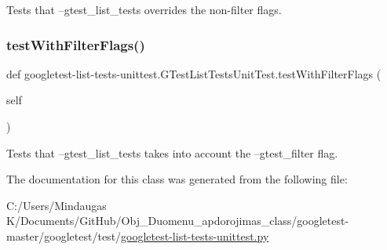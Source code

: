 \begin{DoxyVerb}Tests that --gtest_list_tests overrides the non-filter flags.\end{DoxyVerb}
 \mbox{\label{classgoogletest-list-tests-unittest_1_1_g_test_list_tests_unit_test_adb60d2295fee8ed4af2a5ee1a32e5778}} 
\subsubsection{\texorpdfstring{testWithFilterFlags()}{testWithFilterFlags()}}
{\footnotesize\ttfamily def googletest-\/list-\/tests-\/unittest.\+G\+Test\+List\+Tests\+Unit\+Test.\+test\+With\+Filter\+Flags (\begin{DoxyParamCaption}\item[{}]{self }\end{DoxyParamCaption})}

\begin{DoxyVerb}Tests that --gtest_list_tests takes into account the
--gtest_filter flag.\end{DoxyVerb}
 

The documentation for this class was generated from the following file\+:\begin{DoxyCompactItemize}
\item 
C\+:/\+Users/\+Mindaugas K/\+Documents/\+Git\+Hub/\+Obj\+\_\+\+Duomenu\+\_\+apdorojimas\+\_\+class/googletest-\/master/googletest/test/\mbox{\hyperlink{googletest-master_2googletest_2test_2googletest-list-tests-unittest_8py}{googletest-\/list-\/tests-\/unittest.\+py}}\end{DoxyCompactItemize}
